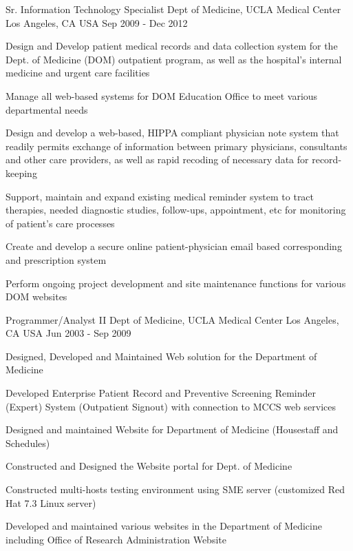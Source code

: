 \begin{cventries}
  \cventry
    {Sr. Information Technology Specialist} %
    {Dept of Medicine, UCLA Medical Center} %
    {Los Angeles, CA USA} %
    {Sep 2009 - Dec 2012} %
    {
      \begin{cvitems} %
        \item {Design and Develop patient medical records and data collection system for the Dept. of Medicine (DOM) outpatient program, as well as the hospital's internal medicine and urgent care facilities}
        \item {Manage all web-based systems for DOM Education Office to meet various departmental needs}      
		 \item {Design and develop a web-based, HIPPA compliant physician note system that readily permits exchange of information between primary physicians, consultants and other care providers, as well as rapid recoding of necessary data for record-keeping} 
		 \item{Support, maintain and expand existing medical reminder system to tract therapies, needed diagnostic studies, follow-ups, appointment, etc for monitoring of patient's care processes}  
		 \item{Create and develop a secure online patient-physician email based corresponding and prescription system}
		 \item{Perform ongoing project development and site maintenance functions for various DOM websites}
      \end{cvitems}
    }

 \cventry
    {Programmer/Analyst II} %
    {Dept of Medicine, UCLA Medical Center} %
    {Los Angeles, CA USA} %
    {Jun 2003 - Sep 2009} %
    {
      \begin{cvitems} %
        \item {Designed, Developed and Maintained Web solution for the Department of Medicine}
		 \item {Developed Enterprise Patient Record and Preventive Screening Reminder (Expert) System (Outpatient Signout) with connection to MCCS web services}
		  \item {Designed and maintained Website for Department of Medicine (Housestaff and Schedules)}
		  \item {Constructed and Designed the Website portal for Dept. of Medicine}
		   \item {Constructed multi-hosts testing environment using SME server (customized Red Hat 7.3 Linux server)}
		   \item {Developed and maintained various websites in the Department of Medicine including Office of Research Administration Website}
      \end{cvitems}
    }


\end{cventries}